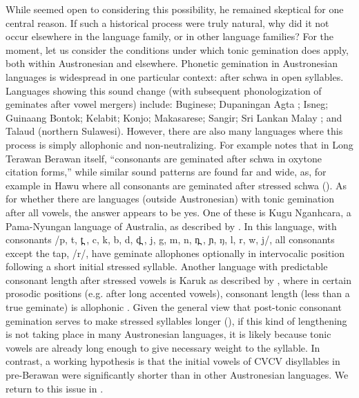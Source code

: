 \documentclass[output=paper]{langscibook}
\begin{document}
While \citet{Blust2018} seemed open to considering this possibility, he remained skeptical for one central reason. If such a historical process were truly natural, why did it not occur elsewhere in the language family, or in other language families? For the moment, let us consider the conditions under which tonic gemination does apply, both within Austronesian and elsewhere. Phonetic gemination in Austronesian languages is widespread in one particular context: after schwa in open syllables. Languages showing this sound change (with subsequent phonologization of geminates after vowel mergers) include: Buginese; Dupaningan Agta \citep{Robinson2008}; Isneg; Guinaang Bontok; Kelabit; Konjo; Makasarese; Sangir; Sri Lankan Malay \citep{Adelaar1991}; and Talaud (northern Sulawesi). However, there are also many languages where this process is simply allophonic and non\hyp neutralizing. For example \citet[133]{Blust1995} notes that in Long Terawan Berawan itself, “consonants are geminated after schwa in oxytone citation forms,” while similar sound patterns are found far and wide, as, for example in Hawu where all consonants are geminated after stressed schwa (\citealt{Walker1982, Blust2008,Blust2012}). As for whether there are languages (outside Austronesian) with tonic gemination after all vowels, the answer appears to be yes. One of these is Kugu Nganhcara, a Pama-Nyungan language of Australia, as described by \citet{SmithJohnson2000}. In this language, with consonants /p, t, t̪ , c, k, b, d, d̪ , j, g, m, n, n̪ , ɲ, ŋ, l, r, w, j/, all consonants except the tap, \mbox{/r/}, have geminate allophones optionally in intervocalic position following a short initial stressed syllable. Another language with predictable consonant length after stressed vowels is Karuk as described by \citet{Bright1957}, where in certain prosodic positions (e.g. after long accented vowels), consonant length (less than a true geminate) is allophonic \citep{Blevins2005b}. Given the general view that post-tonic consonant gemination serves to make stressed syllables longer (\citealt{Gordon2002,Gordon2004, Blevins2005b}), if this kind of lengthening is not taking place in many Austronesian languages, it is likely because tonic  vowels are already long enough to give necessary weight to the syllable. In contrast, a working hypothesis is that the initial vowels of CVCV disyllables in pre-Berawan were significantly shorter than in other Austronesian languages. We return to this issue in .
\end{document}
